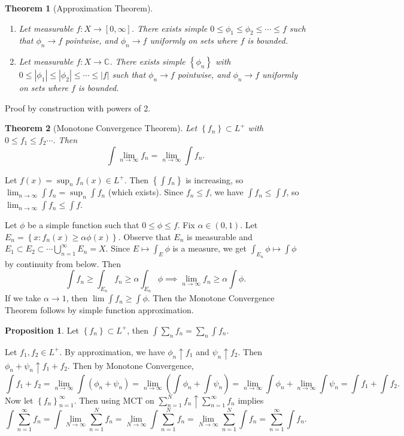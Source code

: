 \documentclass[11pt]{article}
\newtheorem{thm}{Theorem}[section]
\theoremstyle{definition}
\newtheorem{prop}{Proposition}[section]
\newcommand{\set}[1]{\left\{ #1 \right\}}
\newcommand{\abs}[1]{\left\lvert#1\right\rvert} %
\newcommand{\CC}{\mathbb{C}}
\begin{document}
\begin{thm}[Approximation Theorem]
  \begin{enumerate}
    \item[(a)] Let measurable $f:X\to[0,\infty]$. There exists simple
    $0\le\phi_1\le\phi_2\le\cdots\le f$ such that $\phi_n\to f$ pointwise, and $\phi_n\to
    f$ uniformly on sets where $f$ is bounded. 
    \item[(b)] Let measurable $f:X\to\CC$. There exists simple $\set{\phi_n}$ with
    $0\le\abs{\phi_1}\le\abs{\phi_2}\le\cdots\le\abs{f}$ such that $\phi_n\to f$ pointwise,
    and $\phi_n\to f$ uniformly on sets where $f$ is bounded. 
  \end{enumerate}
\end{thm}
\proof
Proof by construction with powers of 2. 
\qedhere

\begin{thm}[Monotone Convergence  Theorem]
  Let $\set{f_n}\subset L^+$ with $0\le f_1\le f_2\cdots$. Then 
  \[
    \int\lim_{n\to\infty}f_n = \lim_{n\to\infty}\int f_n .
  \]
\end{thm}
\proof
  Let $f(x)=\sup_nf_n(x)\in L^+$. Then $\set{\int f_n}$ is increasing, so
  $\lim_{n\to\infty}\int f_n = \sup_n\int f_n$ (which exists). Since $f_n\le f$, we have
  $\int f_n\le \int f$, so $\lim_{n\to\infty}\int f_n\le \int f$.

  Let $\phi$ be a simple function such that $0\le\phi\le f$. Fix $\alpha\in(0,1)$. Let
  $E_n=\set{x:f_n(x)\ge\alpha\phi(x)}$. Observe that $E_n$ is measurable and $E_1\subset
  E_2\subset \cdots \bigcup_{n=1}^\infty E_n = X$.  Since $E\mapsto\int_E\phi$ is a
  measure, we get $\int_{E_n}\phi\mapsto\int\phi$ by continuity from below. Then
  \[
    \int f_n \ge \int_{E_n}f_n \ge \alpha\int_{E_n}\phi
    \implies \lim_{n\to\infty} f_n \ge \alpha\int\phi .
  \]
  If we take $\alpha\to1$, then $\lim\int f_n \ge \int\phi$. Then the Monotone Convergence
  Theorem follows by simple function approximation.
\qedhere

\begin{prop}
  Let $\set{f_n}\subset L^+$, then $\int\sum_nf_n=\sum_n\int f_n$.
\end{prop}
\proof
Let $f_1,f_2\in L^+$. By approximation, we have $\phi_n\uparrow f_1$ and $\psi_n\uparrow
f_2$. Then $\phi_n+\psi_n\uparrow f_1+f_2$. Then by Monotone Convergence, 
\[
  \int f_1+f_2 = \lim_{n\to\infty}\int(\phi_n+\psi_n) =
  \lim_{n\to\infty}\left(\int\phi_n+\int\psi_n\right) =
  \lim_{n\to\infty}\int\phi_n+\lim_{n\to\infty}\int\psi_n = \int f_1 + \int f_2 .
\]
Now let $\set{f_n}_{n=1}^\infty$. Then using MCT on
$\sum_{n=1}^Nf_n\uparrow\sum_{n=1}^\infty f_n$ implies 
\[
  \int\sum_{n=1}^\infty f_n = \int\lim_{N\to\infty}\sum_{n=1}^Nf_n
  = \lim_{N\to\infty}\int\sum_{n=1}^Nf_n = \lim_{N\to\infty}\sum_{n=1}^N\int f_n
  = \sum_{n=1}^\infty\int f_n .
\]
\qedhere
\end{document}
